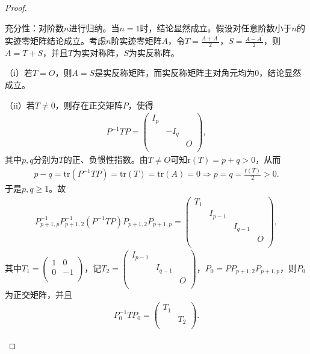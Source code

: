 \documentclass[../../main.tex]{subfiles}
\begin{document}
\begin{proof}
\begin{enumerate}[(1)]
充分性：对阶数\(n\)进行归纳。当\(n = 1\)时，结论显然成立。假设对任意阶数小于\(n\)的实迹零矩阵结论成立。考虑\(n\)阶实迹零矩阵\(A\)，令\(T=\frac{A + A^\prime}{2}\)，\(S=\frac{A - A^\prime}{2}\)，则\(A = T + S\)，并且\(T\)为实对称阵，\(S\)为实反称阵。

（i）若\(T = O\)，则\(A = S\)是实反称矩阵，而实反称矩阵主对角元均为\(0\)，结论显然成立。

（ii）若\(T\ne 0\)，则存在正交矩阵\(P\)，使得
\begin{align*}
P^{-1}TP=\left( \begin{matrix}
I_p& & \\
& -I_q& \\
& & O\\
\end{matrix} \right),
\end{align*}
其中\(p,q\)分别为\(T\)的正、负惯性指数。由\(T\ne O\)可知\(\text{r}(T)=p + q>0\)，从而
\begin{align*}
p - q=\mathrm{tr}(P^{-1}TP)=\mathrm{tr}(T)=\mathrm{tr}(A)=0\Rightarrow p = q=\frac{\mathrm{r}(T)}{2}>0.
\end{align*}
于是\(p,q\geqslant 1\)。故
\begin{align*}
P_{p + 1,p}^{-1}P_{p + 1,2}^{-1}(P^{-1}TP)P_{p + 1,2}P_{p + 1,p}=\left( \begin{matrix}
T_1& & & \\
& I_{p - 1}& & \\
& & I_{q - 1}& \\
& & & O\\
\end{matrix} \right),
\end{align*}
其中\(T_1=\left( \begin{matrix}
1&0\\
0& -1\\
\end{matrix} \right)\)，记\(T_2=\left( \begin{matrix}
I_{p - 1}& & \\
& I_{q - 1}& \\
& & O\\
\end{matrix} \right)\)，\(P_0 = PP_{p + 1,2}P_{p + 1,p}\)，则\(P_0\)为正交矩阵，并且
\begin{align*}
P_{0}^{-1}TP_0=\left( \begin{matrix}
T_1& \\
& T_2\\
\end{matrix} \right).
\end{align*}

\end{enumerate}
\end{proof}
\end{document}
